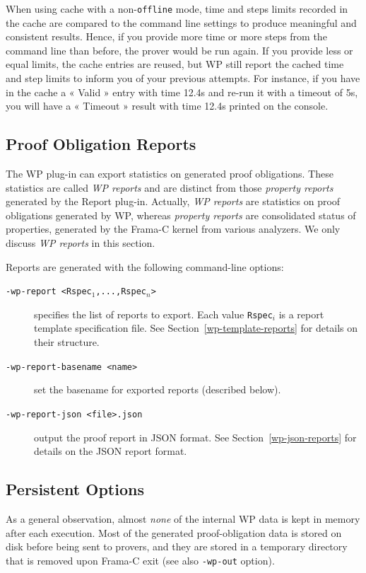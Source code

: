 When using cache with a non-\verb+offline+ mode, time and steps limits recorded in the cache are compared to the command line settings to produce meaningful and consistent results. Hence, if you provide more time or more steps from the command line than before, the prover would be run again. If you provide less or equal limits, the cache entries are reused, but \textsf{WP} still report the cached time and step limits to inform you of your previous attempts. For instance, if you have in the cache a « Valid » entry with time 12.4s and re-run it with a timeout of 5s, you will have a « Timeout » result with time 12.4s printed on the console.

\subsection{Proof Obligation Reports}

The \textsf{WP} plug-in can export statistics on generated proof
obligations. These statistics are called \textit{WP reports} and are
distinct from those \textit{property reports} generated by the
\textsf{Report} plug-in. Actually, \textit{WP reports} are statistics
on proof obligations generated by \textsf{WP}, whereas
\textit{property reports} are consolidated status of properties,
generated by the \textsf{Frama-C} kernel from various analyzers.
We only discuss \textit{WP reports} in this section.

Reports are generated with the following command-line options:
\begin{description}
\item[\tt -wp-report <Rspec$_1$,...,Rspec$_n$>] specifies the list of
  reports to export.
  Each value \texttt{Rspec$_i$} is a report template specification file.
  See Section~\ref{wp-template-reports} for details on their structure.
\item[\tt -wp-report-basename <name>] set the basename for exported
  reports (described below).
\item[\tt -wp-report-json <file>.json] output the proof report in JSON format.
  See Section~\ref{wp-json-reports} for details on the JSON report format.
\end{description}

\subsection{Persistent Options}
\label{wp-persistent}

As a general observation, almost \emph{none} of the internal
\textsf{WP} data is kept in memory after each execution. Most of the
generated proof-obligation data is stored on disk before being sent to
provers, and they are stored in a temporary directory that is removed
upon \textsf{Frama-C} exit (see also \texttt{-wp-out} option).

